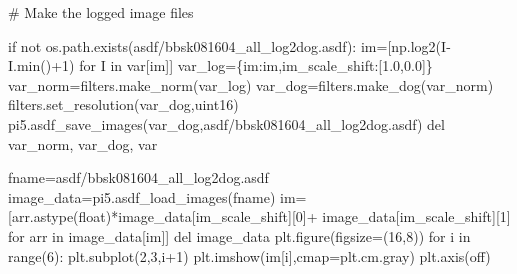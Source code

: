\documentclass[
  letterpaper,
  number]{elsarticle}
\newenvironment{Shaded}{\begin{snugshade}}{\end{snugshade}}
\newcommand{\BuiltInTok}[1]{\textcolor[rgb]{0.00,0.23,0.31}{#1}}
\newcommand{\CommentTok}[1]{\textcolor[rgb]{0.37,0.37,0.37}{#1}}
\newcommand{\ControlFlowTok}[1]{\textcolor[rgb]{0.00,0.23,0.31}{#1}}
\newcommand{\DecValTok}[1]{\textcolor[rgb]{0.68,0.00,0.00}{#1}}
\newcommand{\FloatTok}[1]{\textcolor[rgb]{0.68,0.00,0.00}{#1}}
\newcommand{\KeywordTok}[1]{\textcolor[rgb]{0.00,0.23,0.31}{#1}}
\newcommand{\NormalTok}[1]{\textcolor[rgb]{0.00,0.23,0.31}{#1}}
\newcommand{\OperatorTok}[1]{\textcolor[rgb]{0.37,0.37,0.37}{#1}}
\newcommand{\StringTok}[1]{\textcolor[rgb]{0.13,0.47,0.30}{#1}}
\begin{document}
\begin{Shaded}
\begin{Highlighting}[]
\CommentTok{\# Make the logged image files}

\ControlFlowTok{if} \KeywordTok{not}\NormalTok{ os.path.exists(}\StringTok{\textquotesingle{}asdf/bbsk081604\_all\_log2dog.asdf\textquotesingle{}}\NormalTok{):}
\NormalTok{    im}\OperatorTok{=}\NormalTok{[np.log2(I}\OperatorTok{{-}}\NormalTok{I.}\BuiltInTok{min}\NormalTok{()}\OperatorTok{+}\DecValTok{1}\NormalTok{) }\ControlFlowTok{for}\NormalTok{ I }\KeywordTok{in}\NormalTok{ var[}\StringTok{\textquotesingle{}im\textquotesingle{}}\NormalTok{]]}
\NormalTok{    var\_log}\OperatorTok{=}\NormalTok{\{}\StringTok{\textquotesingle{}im\textquotesingle{}}\NormalTok{:im,}\StringTok{\textquotesingle{}im\_scale\_shift\textquotesingle{}}\NormalTok{:[}\FloatTok{1.0}\NormalTok{,}\FloatTok{0.0}\NormalTok{]\}}
\NormalTok{    var\_norm}\OperatorTok{=}\NormalTok{filters.make\_norm(var\_log)}
\NormalTok{    var\_dog}\OperatorTok{=}\NormalTok{filters.make\_dog(var\_norm)}
\NormalTok{    filters.set\_resolution(var\_dog,}\StringTok{\textquotesingle{}uint16\textquotesingle{}}\NormalTok{)}
\NormalTok{    pi5.asdf\_save\_images(var\_dog,}\StringTok{\textquotesingle{}asdf/bbsk081604\_all\_log2dog.asdf\textquotesingle{}}\NormalTok{) }
    \KeywordTok{del}\NormalTok{ var\_norm, var\_dog, var}
\end{Highlighting}
\end{Shaded}

\begin{Shaded}
\begin{Highlighting}[]
\NormalTok{fname}\OperatorTok{=}\StringTok{\textquotesingle{}asdf/bbsk081604\_all\_log2dog.asdf\textquotesingle{}}
\NormalTok{image\_data}\OperatorTok{=}\NormalTok{pi5.asdf\_load\_images(fname)}
\NormalTok{im}\OperatorTok{=}\NormalTok{[arr.astype(}\BuiltInTok{float}\NormalTok{)}\OperatorTok{*}\NormalTok{image\_data[}\StringTok{\textquotesingle{}im\_scale\_shift\textquotesingle{}}\NormalTok{][}\DecValTok{0}\NormalTok{]}\OperatorTok{+}
\NormalTok{        image\_data[}\StringTok{\textquotesingle{}im\_scale\_shift\textquotesingle{}}\NormalTok{][}\DecValTok{1}\NormalTok{] }\ControlFlowTok{for}\NormalTok{ arr }\KeywordTok{in}\NormalTok{ image\_data[}\StringTok{\textquotesingle{}im\textquotesingle{}}\NormalTok{]]}
\KeywordTok{del}\NormalTok{ image\_data}
\NormalTok{plt.figure(figsize}\OperatorTok{=}\NormalTok{(}\DecValTok{16}\NormalTok{,}\DecValTok{8}\NormalTok{))}
\ControlFlowTok{for}\NormalTok{ i }\KeywordTok{in} \BuiltInTok{range}\NormalTok{(}\DecValTok{6}\NormalTok{):}
\NormalTok{    plt.subplot(}\DecValTok{2}\NormalTok{,}\DecValTok{3}\NormalTok{,i}\OperatorTok{+}\DecValTok{1}\NormalTok{)}
\NormalTok{    plt.imshow(im[i],cmap}\OperatorTok{=}\NormalTok{plt.cm.gray)}
\NormalTok{    plt.axis(}\StringTok{\textquotesingle{}off\textquotesingle{}}\NormalTok{)}
\end{Highlighting}
\end{Shaded}
\end{document}
